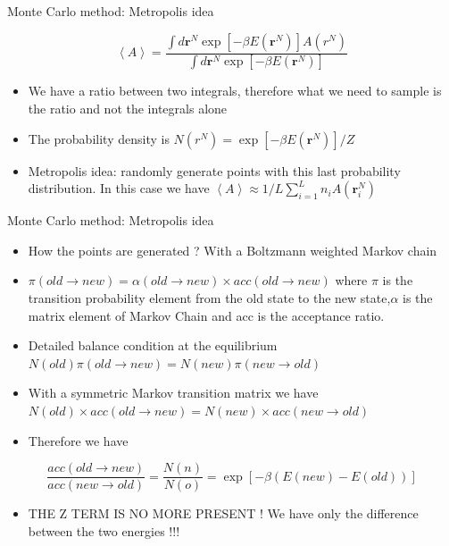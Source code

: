 \documentclass{beamer}
\begin{document}
\begin{frame}{Monte Carlo method: Metropolis idea \cite{frenkel2001understanding}}


\begin{equation}
\left\langle A \right\rangle=\dfrac{\int d\textbf{r}^{N}\exp\left[ -\beta E(\textbf{r}^{N}) \right]A(r^{N})}{\int d\textbf{r}^{N}\exp\left[ -\beta E(\textbf{r}^{N}) \right]}
\end{equation}

\begin{itemize}
\item We have a ratio between two integrals, therefore what we need to sample is the ratio and not the integrals alone
\item The probability density is $N(r^{N})=\exp\left[-\beta E(\textbf{r}^{N}) \right]/Z$
\item Metropolis idea: randomly generate points with this last probability distribution. In this case we have $\left\langle A \right\rangle \approx 1/L\sum_{i=1}^{L}n_{i}A(\textbf{r}_{i}^{N})$

\end{itemize}
\end{frame}


\begin{frame}{Monte Carlo method: Metropolis idea \cite{frenkel2001understanding}}

\begin{itemize}

\item How the points are generated ? With a Boltzmann weighted Markov chain
\item $\pi(old \rightarrow new) = \alpha (old \rightarrow new) \times acc(old \rightarrow new) $ where $\pi$ is the transition probability element from the old state to the new state,$\alpha$ is the matrix element of Markov Chain and acc is the acceptance ratio. 
\item Detailed balance condition at the equilibrium $N(old)\pi(old \rightarrow new)= N(new)\pi(new \rightarrow old) $ 
\item With a symmetric Markov transition matrix we have $N(old)\times acc(old\rightarrow new) = N(new) \times acc(new\rightarrow old)$
\item Therefore we have 
\end{itemize}

\begin{equation}
\frac{acc(old \rightarrow new)}{acc(new \rightarrow old)}=\dfrac{N(n)}{N(o)}=\exp\left[ -\beta \left( E(new)-E(old) \right) \right]
\end{equation}
\begin{itemize}
\item THE Z TERM IS NO MORE PRESENT ! We have only the difference between the two energies !!!
\end{itemize}


\end{frame}
\end{document}
